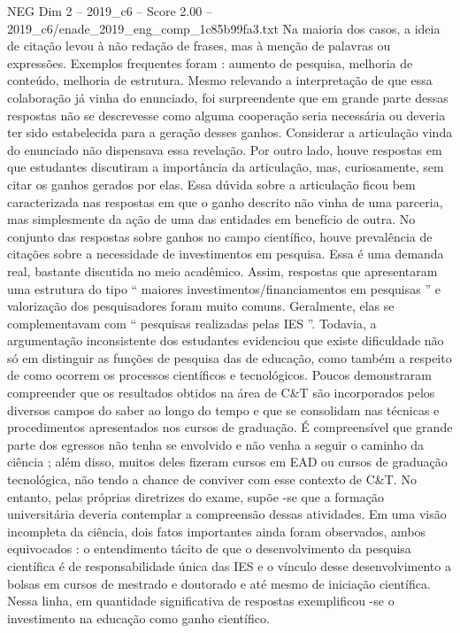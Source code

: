 \begin{textsample}{NEG Dim 2 – 2019\_c6 – Score 2.00 – 2019\_c6/enade\_2019\_eng\_comp\_1c85b99fa3.txt}
Na maioria dos casos, a ideia de citação levou à não redação de frases, mas à menção de palavras ou expressões.
Exemplos frequentes foram : aumento de pesquisa, melhoria de conteúdo, melhoria de estrutura.
Mesmo relevando a interpretação de que essa colaboração já vinha do enunciado, foi surpreendente que em grande parte dessas respostas não se descrevesse como alguma cooperação seria necessária ou deveria ter sido estabelecida para a geração desses ganhos.
Considerar a articulação vinda do enunciado não dispensava essa revelação.
Por outro lado, houve respostas em que estudantes discutiram a importância da articulação, mas, curiosamente, sem citar os ganhos gerados por elas.
Essa dúvida sobre a articulação ficou bem caracterizada nas respostas em que o ganho descrito não vinha de uma parceria, mas simplesmente da ação de uma das entidades em benefício de outra.
No conjunto das respostas sobre ganhos no campo científico, houve prevalência de citações sobre a necessidade de investimentos em pesquisa.
Essa é uma demanda real, bastante discutida no meio acadêmico.
Assim, respostas que apresentaram uma estrutura do tipo “ maiores investimentos/financiamentos em pesquisas ” e valorização dos pesquisadores foram muito comuns.
Geralmente, elas se complementavam com “ pesquisas realizadas pelas IES ”.
Todavia, a argumentação inconsistente dos estudantes evidenciou que existe dificuldade não só em distinguir as funções de pesquisa das de educação, como também a respeito de como ocorrem os processos científicos e tecnológicos.
Poucos demonstraram compreender que os resultados obtidos na área de C\&T são incorporados pelos diversos campos do saber ao longo do tempo e que se consolidam nas técnicas e procedimentos apresentados nos cursos de graduação.
É compreensível que grande parte dos egressos não tenha se envolvido e não venha a seguir o caminho da ciência ; além disso, muitos deles fizeram cursos em EAD ou cursos de graduação tecnológica, não tendo a chance de conviver com esse contexto de C\&T.
No entanto, pelas próprias diretrizes do exame, supõe -se que a formação universitária deveria contemplar a compreensão dessas atividades.
Em uma visão incompleta da ciência, dois fatos importantes ainda foram observados, ambos equivocados : o entendimento tácito de que o desenvolvimento da pesquisa científica é de responsabilidade única das IES e o vínculo desse desenvolvimento a bolsas em cursos de mestrado e doutorado e até mesmo de iniciação científica.
Nessa linha, em quantidade significativa de respostas exemplificou -se o investimento na educação como ganho científico.

\end{textsample}

